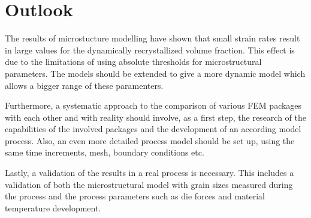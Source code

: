 \section{Outlook}

The results of microstucture modelling have shown that small strain rates result in large values for the dynamically recrystallized volume fraction. This effect is due to the limitations of using absolute thresholds for microstructural parameters. The models should be extended to give a more dynamic model which allows a bigger range of these paramenters.

Furthermore, a systematic approach to the comparison of various FEM packages with each other and with reality should involve, as a first step, the research of the capabilities of the involved packages and the development of an according model process. Also, an even more detailed process model should be set up, using the same time increments, mesh, boundary conditions etc.

Lastly, a validation of the results in a real process is necessary. This includes a validation of both the microstructural model with grain sizes measured during the process and the process parameters such as die forces and material temperature development.
